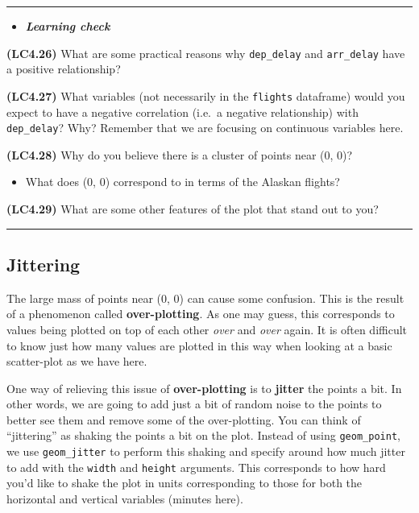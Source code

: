 \documentclass[]{tufte-book}
\let\oldrule=\rule
\renewcommand{\rule}[1]{\oldrule{\linewidth}}
\providecommand{\tightlist}{%
  \setlength{\itemsep}{0pt}\setlength{\parskip}{0pt}}
\newenvironment{rmdblock}[1]
  {\begin{shaded*}
  \begin{itemize}
  \renewcommand{\labelitemi}{
    \raisebox{-.7\height}[0pt][0pt]{
    }
  }
  \item
  }
  {
  \end{itemize}
  \end{shaded*}
  }
\newenvironment{learncheck}
  {\begin{rmdblock}{warning}}
  {\end{rmdblock}}
\begin{document}
\begin{center}\rule{0.5\linewidth}{\linethickness}\end{center}

\begin{learncheck}
\textbf{\emph{Learning check}}
\end{learncheck}

\textbf{(LC4.26)} What are some practical reasons why
\texttt{dep\_delay} and \texttt{arr\_delay} have a positive
relationship?

\textbf{(LC4.27)} What variables (not necessarily in the
\texttt{flights} dataframe) would you expect to have a negative
correlation (i.e.~a negative relationship) with \texttt{dep\_delay}?
Why? Remember that we are focusing on continuous variables here.

\textbf{(LC4.28)} Why do you believe there is a cluster of points near
(0, 0)?

\begin{itemize}
\tightlist
\item
  What does (0, 0) correspond to in terms of the Alaskan flights?
\end{itemize}

\textbf{(LC4.29)} What are some other features of the plot that stand
out to you?

\begin{center}\rule{0.5\linewidth}{\linethickness}\end{center}

\subsection{Jittering}\label{jittering}

The large mass of points near (0, 0) can cause some confusion. This is
the result of a phenomenon called \textbf{over-plotting}. As one may
guess, this corresponds to values being plotted on top of each other
\emph{over} and \emph{over} again. It is often difficult to know just
how many values are plotted in this way when looking at a basic
scatter-plot as we have here.

One way of relieving this issue of \textbf{over-plotting} is to
\textbf{jitter} the points a bit. In other words, we are going to add
just a bit of random noise to the points to better see them and remove
some of the over-plotting. You can think of ``jittering'' as shaking the
points a bit on the plot. Instead of using \texttt{geom\_point}, we use
\texttt{geom\_jitter} to perform this shaking and specify around how
much jitter to add with the \texttt{width} and \texttt{height}
arguments. This corresponds to how hard you'd like to shake the plot in
units corresponding to those for both the horizontal and vertical
variables (minutes here).
\end{document}
